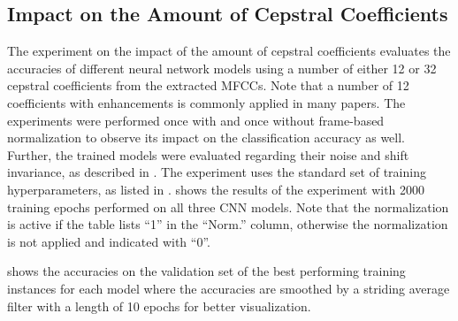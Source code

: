 \subsection{Impact on the Amount of Cepstral Coefficients}
The experiment on the impact of the amount of cepstral coefficients evaluates the accuracies of different neural network models using a number of either 12 or 32 cepstral coefficients from the extracted MFCCs.
Note that a number of 12 coefficients with enhancements is commonly applied in many papers.
The experiments were performed once with and once without frame-based normalization to observe its impact on the classification accuracy as well.
Further, the trained models were evaluated regarding their noise and shift invariance, as described in .
The experiment uses the standard set of training hyperparameters, as listed in .
 shows the results of the experiment with 2000 training epochs performed on all three CNN models.
Note that the normalization is active if the table lists \enquote{1} in the \enquote{Norm.} column, otherwise the normalization is not applied and indicated with \enquote{0}.

 shows the accuracies on the validation set of the best performing training instances for each model where the accuracies are smoothed by a striding average filter with a length of 10 epochs for better visualization.
